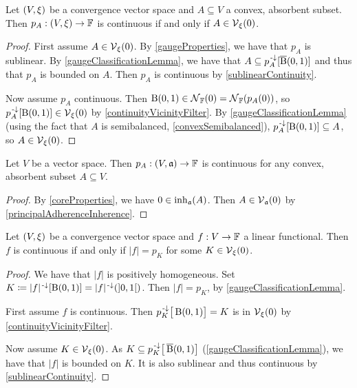 \begin{proposition} \label{continuityConvexGauge}
Let $\left( V, \xi \right)$ be a convergence vector space and $A\subseteq V$ a convex, absorbent subset. Then $p_A: \left( V,\xi \right) \to \mathbb{F}$ is continuous \textup{if and only if} $A\in\operatorname{\mathcal{V}}_\xi(0)$.
\end{proposition}
\begin{proof}
First assume $A\in\operatorname{\mathcal{V}}_\xi(0)$. By \ref{gaugeProperties}, we have that $p_A$ is sublinear. By \ref{gaugeClassificationLemma}, we have that $A \subseteq p_A^{\text{\hspace{0.15em}-}\downarrow}[\operatorname{\overline{B}}(0,1)]$ and thus that $p_A$ is bounded on $A$. Then $p_A$ is continuous by \ref{sublinearContinuity}.

Now assume $p_A$ continuous. Then $\operatorname{B}(0,1) \in \operatorname{\mathcal{N}}_{\mathbb{F}}(0) = \operatorname{\mathcal{N}}_{\mathbb{F}}(p_A(0))$, so $p_A^{\text{\hspace{0.15em}-}\downarrow}[\operatorname{B}(0,1)] \in \operatorname{\mathcal{V}}_\xi(0)$ by \ref{continuityVicinityFilter}. By \ref{gaugeClassificationLemma} (using the fact that $A$ is semibalanced, \ref{convexSemibalanced}), $p_A^{\text{\hspace{0.15em}-}\downarrow}[\operatorname{B}(0,1)] \subseteq A$, so $A\in\operatorname{\mathcal{V}}_\xi(0)$.
\end{proof}
\begin{corollary} \label{gaugeContinuousAlgebraicConvergence}
Let $V$ be a vector space. Then $p_A: \left( V,\mathfrak{a} \right) \to \mathbb{F}$ is continuous for any convex, absorbent subset $A \subseteq V$.
\end{corollary}
\begin{proof}
By \ref{coreProperties}, we have $0\in\operatorname{inh}_\mathfrak{a}(A)$. Then $A\in \operatorname{\mathcal{V}}_\mathfrak{a}(0)$ by \ref{principalAdherenceInherence}.
\end{proof}

\begin{lemma} \label{absoluteFunctionalGauge}
Let $\left( V, \xi \right)$ be a convergence vector space and $f: V\to \mathbb{F}$ a linear functional. Then $f$ is continuous \textup{if and only if} $|f| = p_K$ for some $K\in\operatorname{\mathcal{V}}_\xi(0)$.
\end{lemma}
\begin{proof}
We have that $|f|$ is positively homogeneous. Set $K \defeq |f|^{\preimf}[\ball(0,1)] = |f|^{\preimf}(\interval[o]{0,1})$. Then $|f| = p_{K}$, by \ref{gaugeClassificationLemma}. 

First assume $f$ is continuous. Then $p_K^{\text{\hspace{0.15em}-}\downarrow}\big[\operatorname{B}(0,1)\big] = K$ is in $\operatorname{\mathcal{V}}_\xi(0)$ by \ref{continuityVicinityFilter}.

Now assume $K\in\operatorname{\mathcal{V}}_\xi(0)$. As $K \subseteq p_K^{\text{\hspace{0.15em}-}\downarrow}\big[\operatorname{\overline{B}}(0,1)\big]$ (\ref{gaugeClassificationLemma}), we have that $|f|$ is bounded on $K$. It is also sublinear and thus continuous by \ref{sublinearContinuity}.
\end{proof}


